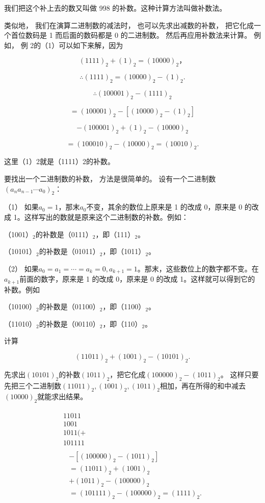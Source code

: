我们把这个补上去的数又叫做 998 的补数。这种计算方法叫做补数法。

类似地， 我们在演算二进制数的减法时， 也可以先求出减数的补数，
把它化成一个首位数码是 1 而后面的数码都是 0 的二进制数。
然后再应用补数法来计算。 例如， 例 2的（1）可以如下来解，因为

\[
(1111) _{2} + (1) _{2} = (10000) _{2}\text{，}
\]

\[
\therefore (1111) _{2} = (10000) _{2} - (1) _{2}.
\]

\[
\therefore (100001) _{2} - (1111) _{2}
\]

\[
= (100001) _{2} - [ (10000) _{2} - (1) _{2} ]
\]

\[
- (100001) _{2} + (1) _{2} - (10000) _{2}
\]

\[
= (100010) _{2} - (10000) _{2} = (10010) _{2}.
\]

这里（1）2就是（1111）2的补数。

要找出一个二进制数的补数， 方法是很简单的。
设有一个二进制数\((a_{n}a_{n-1}\cdots a_{0})_{2}\)：

（1） 如果\(a_0 = 1\)，那末\(a_0\)不变，其余的数位上原来是 1 的改成
0，原来是 0 的改成 1。这样写出的数就是原来这个二进制数的补数。例如：

（1001）\(_{2}\)的补数是（0111）\(_{2}\)，即（111）\(_{2}\)。

（10101）\(_{2}\)的补数是（01011）\(_{2}\)，即（1011）\(_{2}\)。

（2）
如果\(a_0 = a_1 = \cdots = a_k = 0, a_{k+1} = 1\)。那末，这些数位上的数字都不变。在\(a_{k+1}\)前面的数字，原来是
1 的改成 0，原来是 0 的改成 1。这样就可以得到它的补数。例如

（10100）\(_{2}\)的补数是（01100）\(_{2}\)，即（1100）\(_{2}\)。

（11010）\(_{2}\)的补数是（00110）\(_{2}\)，即（110）\(_{2}\)。

 计算

\[
(11011) _{2} + (1001) _{2} - (10101) _{2}.
\]

先求出\((10101)_{2}\)的补数\((1011)_{2}\)，把它化成\((100000)_{2}-(1011)_{2}\)。
这样只要先把三个二进制数\((11011)_{2}, (1001)_{2}, (1011)_{2}\)相加，再在所得的和中减去\((10000)_{2}\)就能求出结果。


\[
\begin{array}{l} \begin{array}{rl} {11011} & \\ {1001} & \\ {1011 (+} & \\ {101111} & \end{array} \\ \begin{array}{rl} & - [ (100000) _{2} - (1011) _{2} ] \\ & = (11011) _{2} + (1001) _{2} \\ & + (1011) _{2} - (100000) _{2} \\ & = (101111) _{2} - (100000) _{2} = (1111) _{2}. \end{array} \\ \end{array}
\]

